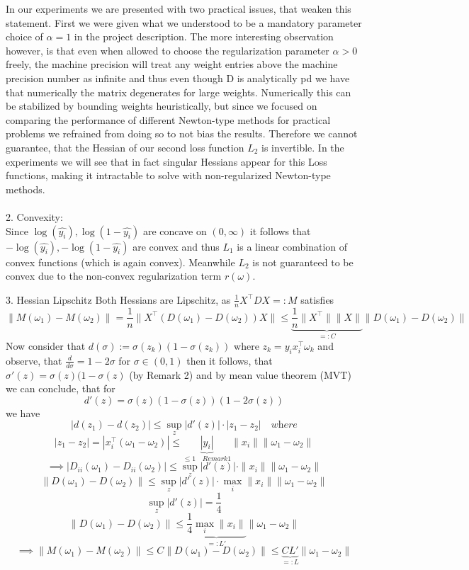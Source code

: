 \documentclass{article}
\begin{document}
In our experiments we are presented with two practical issues, that weaken this statement. First we were given what we understood to be a mandatory parameter choice of  $\alpha = 1$ in the project description. The more interesting observation however, is that even when allowed to choose the regularization parameter $\alpha>0$ freely, the machine precision will treat any weight entries above the machine precision number as infinite and thus even though D is analytically pd we have that numerically the matrix degenerates for large weights. Numerically this can be stabilized by bounding weights heuristically, but since we focused on comparing the performance of different Newton-type methods for practical problems we refrained from doing so to not bias the results. Therefore we cannot guarantee, that the Hessian of our second loss function $L_2$ is invertible. In the experiments we will see that in fact singular Hessians appear for this Loss functions, making it intractable to solve with non-regularized Newton-type methods.\\
\\
2. Convexity:\\
Since $\log(\hat{y_i}),\log(1-\hat{y_i})$ are concave on $(0,\infty)$ it follows that $-\log(\hat{y_i}),-\log(1-\hat{y_i})$ are convex and thus $L_1$ is a linear combination of convex functions (which is again convex). Meanwhile $L_2$ is not guaranteed to be convex due to the non-convex regularization term $r(\omega)$.

3. Hessian Lipschitz
Both Hessians are Lipschitz, as $ \frac{1}{n} X ^\top D X =:M$ satisfies
$$ \| M(\omega _1)-M(\omega _2)\| = \frac{1}{n}\| X^\top (D(\omega_1)-D(\omega_2))X \| \leq \underbrace{\frac{1}{n} \|X^\top \| \|X\| }_{=:C}\|D(\omega_1)-D(\omega_2)\|$$
Now consider that $d(\sigma) := \sigma(z_k)(1- \sigma(z_k))$ where $ z_k = y_i x_i^\top \omega_k$ and observe, that $\frac{d}{d\sigma} = 1-2\sigma$ for $\sigma \in (0,1)$ then it follows, that $\sigma '(z) = \sigma (z) (1-\sigma(z)$ (by Remark 2) and by mean value theorem (MVT) we can conclude, that for
\[
d'(z) = \sigma(z)(1 - \sigma(z))(1 - 2\sigma(z))
\]
we have 
\[
|d(z_1) - d(z_2)| \leq \sup_z |d'(z)| \cdot |z_1 - z_2| \quad \textit{where}
\]
\[
|z_1 - z_2| = | x_i^\top (\omega_1 - \omega_2)| \leq \underbrace{|y_i|}_{\leq 1 \quad Remark 1} \|x_i\| \|\omega_1 - \omega_2\|
\]
\[
\implies |D_{ii}(\omega_1) - D_{ii}(\omega_2)| \leq \sup_z |d'(z)| \cdot \|x_i\| \|\omega_1 - \omega_2\|
\]
\[
\|D(\omega_1) - D(\omega_2)\| \leq \sup_z |d'(z)| \cdot \max_i \|x_i\| \|\omega_1 - \omega_2\|
\]
\[
\sup_z |d'(z)| = \frac{1}{4}
\]
\[
\|D(\omega_1) - D(\omega_2)\| \leq \underbrace{\frac{1}{4} \max_i \|x_i\|}_{=:L'} \|\omega_1 - \omega_2\|
\]
$$\implies \| M(\omega _1)-M(\omega _2)\| \leq C \|D(\omega_1)-D(\omega_2)\| \leq \underbrace{C L'}_{=:L} \|\omega_1 - \omega_2 \| $$
\end{document}
